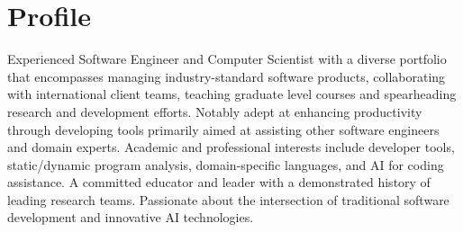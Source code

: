 \documentclass[12pt,a4paper,sans]{moderncv}
\begin{document}
\pagestyle{empty}
\makecvtitle

\section{Profile}
Experienced Software Engineer and Computer Scientist with a diverse portfolio that encompasses managing industry-standard software products, collaborating with international client teams, teaching graduate level courses and spearheading research and development efforts. Notably adept at enhancing productivity through developing tools primarily aimed at assisting other software engineers and domain experts. Academic and professional interests include developer tools, static/dynamic program analysis, domain-specific languages, and AI for coding assistance. A committed educator and leader with a demonstrated history of leading research teams. Passionate about the intersection of traditional software development and innovative AI technologies.
\end{document}
